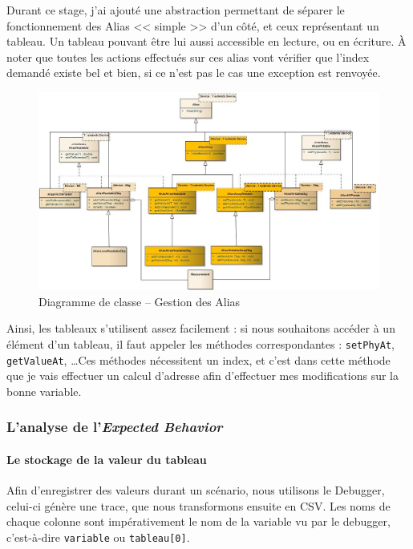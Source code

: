 Durant ce stage, j'ai ajouté une abstraction permettant de séparer le fonctionnement des Alias << simple >> d'un côté, et ceux représentant un tableau. Un tableau pouvant être lui aussi accessible en lecture, ou en écriture. À noter que toutes les actions effectués sur ces alias vont vérifier que l'index demandé existe bel et bien, si ce n'est pas le cas une exception est renvoyée. 
\begin{figure}[H]
\hspace{-35px}
\includegraphics[width=20.5cm]{contents/images/alias.jpg}
\caption{Diagramme de classe -- Gestion des Alias}
\label{fig:aliasClasses}
\end{figure}

Ainsi, les tableaux s'utilisent assez facilement : si nous souhaitons accéder à un élément d'un tableau, il faut appeler les méthodes correspondantes : \texttt{setPhyAt}, \texttt{getValueAt}, \ldots Ces méthodes nécessitent un index, et c'est dans cette méthode que je vais effectuer un calcul d'adresse afin d'effectuer mes modifications sur la bonne variable.


\subsubsection{L'analyse de l'\textit{Expected Behavior}}


\paragraph{Le stockage de la valeur du tableau} Afin d'enregistrer des valeurs durant un scénario, nous utilisons le Debugger, celui-ci génère une trace, que nous transformons ensuite en CSV. Les noms de chaque colonne sont impérativement le nom de la variable vu par le debugger, c'est-à-dire \texttt{variable} ou \texttt{tableau[0]}.

